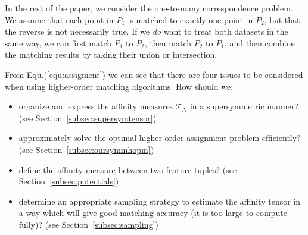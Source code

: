 In the rest of the paper, we consider the one-to-many correspondence problem.
We assume that each point in $P_1$ is matched to exactly one point in $P_2$, but that the reverse is not necessarily true.
If we \emph{do} want to treat both datasets in the same way,
we can first match $P_1$ to $P_2$, then match $P_2$ to $P_1$, and then combine the matching results by taking their union or intersection.

From Equ.(\ref{equ:assigment}) we can see that there are four issues to be considered when using higher-order matching algorithms. How should we:
\begin{itemize}
\item organize and express the affinity measures $\mathcal{T}_N$ in a supersymmetric manner? (see Section~\ref{subsec:supersymtensor})
\item approximately solve the optimal higher-order assignment problem efficiently? (see Section~\ref{subsec:oursymmhopm})
\item define the affinity measure between two feature tuples? (see Section~\ref{subsec:potentials})
\item determine an appropriate sampling strategy to estimate the affinity tensor in a way which will give good matching accuracy (it is too large to compute fully)? (see Section~\ref{subsec:sampling})
\end{itemize}




